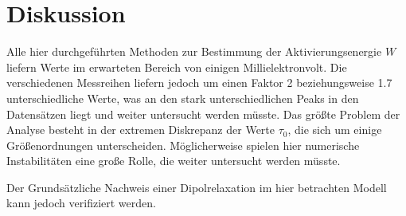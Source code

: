 \newpage
\section{Diskussion}
\label{sec:diskussion}
Alle hier durchgeführten Methoden zur Bestimmung der Aktivierungsenergie $W$
liefern Werte im erwarteten Bereich von einigen Millielektronvolt.
Die verschiedenen Messreihen liefern jedoch um einen Faktor \num{2} beziehungsweise
\num{1.7} unterschiedliche Werte, was an den stark unterschiedlichen Peaks
in den Datensätzen liegt und weiter untersucht werden müsste.
Das größte Problem der Analyse besteht in der extremen Diskrepanz der Werte
$\tau_0$, die sich um einige Größenordnungen unterscheiden. Möglicherweise
spielen hier numerische Instabilitäten eine große Rolle, die weiter untersucht
werden müsste.

Der Grundsätzliche Nachweis einer Dipolrelaxation im hier betrachten Modell
kann jedoch verifiziert werden.
